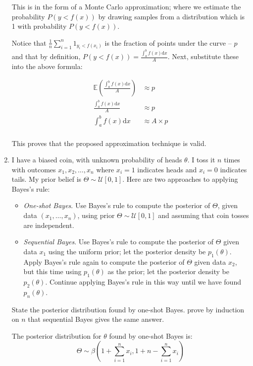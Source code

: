 \documentclass[10pt,\jkfside,a4paper]{article}
\begin{document}
\begin{enumerate}
This is in the form of a Monte Carlo approximation; where we estimate the
probability $P(y < f(x))$ by drawing samples from a distribution which is 1
with probability $P(y < f(x))$.

Notice that $\frac{1}{n}\sum^n_{i=1} 1_{y_i < f(x_i)}$ is the fraction of
points under the curve -- $p$ and that by definition, $P(y < f(x)) = \frac{\int^b_a f(x)
\text{d}x}{A}$. Next, substitute these into the above formula:

\[
\begin{split}
\mathbb{E}\left(\frac{\int^b_a f(x)\text{d}x}{A}\right) &\approx p \\
\frac{\int^b_a f(x)\text{d}x}{A} &\approx p \\
\int^b_a f(x)\text{d}x &\approx A \times p \\
\end{split}
\]

This proves that the proposed approximation technique is valid.

\item I have a biased coin, with unknown probability of heads $\theta$. I
toss it $n$ times with outcomes $x_1, x_2, \dots, x_n$ where $x_i = 1$
indicates heads and $x_i = 0$ indicates tails. My prior belief is $\Theta
\sim \mathcal{U}[0, 1]$. Here are two approaches to applying Bayes's rule:
\begin{itemize}

\item \textit{One-shot Bayes}. Use Bayes's rule to compute the posterior of
$\Theta$, given data $(x_1, \dots, x_n)$, using prior $\Theta \sim
\mathcal{U}[0, 1]$ and assuming that coin tosses are independent.

\item \textit{Sequential Bayes}. Use Bayes's rule to compute the posterior
of $\Theta$ given data $x_1$ using the uniform prior; let the posterior
density be $p_1(\theta)$. Apply Bayes's rule again to compute the posterior
of $\Theta$ given data $x_2$, but this time using $p_1(\theta)$ as the
prior; let the posterior density be $p_2(\theta)$. Continue applying
Bayes's rule in this way until we have found $p_n(\theta)$.

\end{itemize}

State the posterior distribution found by one-shot Bayes. prove by induction
on $n$ that sequential Bayes gives the same answer.

The posterior distribution for $\theta$ found by one-shot Bayes is:
\[
\Theta \sim \beta\left( 1 + \sum^n_{i=1}x_i, 1 + n - \sum^n_{i=1}x_i \right)
\]


\end{enumerate}
\end{document}
